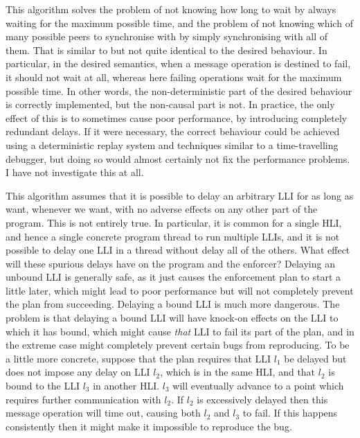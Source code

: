 This algorithm solves the problem of not knowing how long to wait by
always waiting for the maximum possible time, and the problem of not
knowing which of many possible peers to synchronise with by simply
synchronising with all of them.  That is similar to but not quite
identical to the desired behaviour.  In particular, in the desired
semantics, when a message operation is destined to fail, it should not
wait at all, whereas here failing operations wait for the maximum
possible time.  In other words, the non-deterministic part of the
desired behaviour is correctly implemented, but the non-causal part is
not.  In practice, the only effect of this is to sometimes cause poor
performance, by introducing completely redundant delays.  If it were
necessary, the correct behaviour could be achieved using a
deterministic replay system\needCite{} and techniques similar to a
time-travelling debugger\needCite{}, but doing so would almost
certainly not fix the performance problems.  I have not investigate
this at all.

This algorithm assumes that it is possible to delay an arbitrary LLI
for as long as want, whenever we want, with no adverse effects on any
other part of the program.  This is not entirely true.  In particular,
it is common for a single HLI, and hence a single concrete program
thread to run multiple LLIs, and it is not possible to delay one LLI
in a thread without delay all of the others.  What effect will these
spurious delays have on the program and the enforcer?  Delaying an
unbound LLI is generally safe, as it just causes the enforcement plan
to start a little later, which might lead to poor performance but will
not completely prevent the plan from succeeding.  Delaying a bound LLI
is much more dangerous.  The problem is that delaying a bound LLI will
have knock-on effects on the LLI to which it has bound, which might
cause \emph{that} LLI to fail its part of the plan, and in the extreme
case might completely prevent certain bugs from reproducing.  To be a
little more concrete, suppose that the plan requires that LLI $l_1$ be
delayed but does not impose any delay on LLI $l_2$, which is in the
same HLI, and that $l_2$ is bound to the LLI $l_3$ in another HLI.
$l_3$ will eventually advance to a point which requires further
communication with $l_2$.  If $l_2$ is excessively delayed then this
message operation will time out, causing both $l_2$ and $l_3$ to fail.
If this happens consistently then it might make it impossible to
reproduce the bug.

